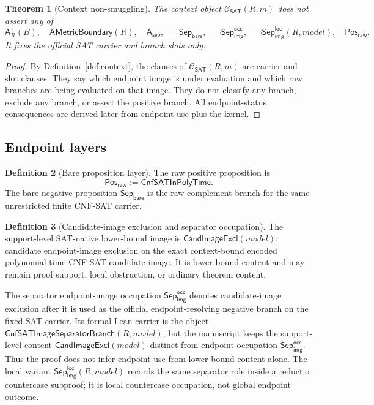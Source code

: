 \documentclass[11pt]{article}
\newtheorem{theorem}{Theorem}[section]
\theoremstyle{definition}
\newtheorem{definition}[theorem]{Definition}
\theoremstyle{remark}
\newcommand{\PosRaw}{\mathsf{Pos}_{\mathsf{raw}}}
\newcommand{\SepBare}{\mathsf{Sep}_{\mathsf{bare}}}
\newcommand{\SepImgOcc}{\mathsf{Sep}_{\mathsf{img}}^{\mathsf{occ}}}
\newcommand{\LocalSepImgOcc}{\mathsf{Sep}_{\mathsf{img}}^{\mathsf{loc}}}
\newcommand{\Asep}{\mathsf{A}_{\mathsf{sep}}}
\newcommand{\Aplus}{\mathsf{A}^{+}}
\newcommand{\CnfSATP}{\mathsf{CnfSATInPolyTime}}
\newcommand{\CnfImageSep}{\mathsf{CnfSATImageSeparatorBranch}}
\newcommand{\AMetric}{\mathsf{AMetricBoundary}}
\newcommand{\ClayCtx}{\mathcal{C}_{\mathsf{SAT}}(R,m)}
\newcommand{\CandImageExcl}{\mathsf{CandImageExcl}}
\begin{document}
\begin{theorem}[Context non-smuggling]\label{thm:context-non-smuggling}
The context object \(\ClayCtx\) does not assert any of
\[
  \Aplus_R(B),\quad \AMetric(R),\quad \Asep,\quad \neg\SepBare,
  \quad \neg\SepImgOcc,\quad \neg\LocalSepImgOcc(R,model),\quad \PosRaw.
\]
It fixes the official SAT carrier and branch slots only.
\end{theorem}

\begin{proof}
By Definition~\ref{def:context}, the clauses of \(\ClayCtx\) are carrier and slot clauses. They say which endpoint image is under evaluation and which raw branches are being evaluated on that image. They do not classify any branch, exclude any branch, or assert the positive branch. All endpoint-status consequences are derived later from endpoint use plus the kernel.
\end{proof}

\subsection{Endpoint layers}

\begin{definition}[Bare proposition layer]\label{def:bare}
The raw positive proposition is
\[
  \PosRaw := \CnfSATP.
\]
The bare negative proposition \(\SepBare\) is the raw complement branch for the same unrestricted finite CNF-SAT carrier.
\end{definition}

\begin{definition}[Candidate-image exclusion and separator occupation]\label{def:image}
The support-level SAT-native lower-bound image is \(\CandImageExcl(model)\): candidate endpoint-image exclusion on the exact context-bound encoded polynomial-time CNF-SAT candidate image. It is lower-bound content and may remain proof support, local obstruction, or ordinary theorem content.

The separator endpoint-image occupation \(\SepImgOcc\) denotes candidate-image exclusion after it is used as the official endpoint-resolving negative branch on the fixed SAT carrier. Its formal Lean carrier is the object \(\CnfImageSep(R,model)\), but the manuscript keeps the support-level content \(\CandImageExcl(model)\) distinct from endpoint occupation \(\SepImgOcc\). Thus the proof does not infer endpoint use from lower-bound content alone. The local variant \(\LocalSepImgOcc(R,model)\) records the same separator role inside a reductio countercase subproof; it is local countercase occupation, not global endpoint outcome.
\end{definition}
\end{document}

